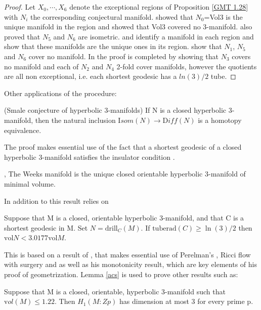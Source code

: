 \begin{proof}{}
	Let $X_0, \cdots, X_6$ denote the exceptional regions of Proposition \ref{GMT 1.28}
with $N_i$ the corresponding conjectural manifold.
\cite{GMT} showed that $N_0$=Vol3 is the unique manifold in the region
and \cite{JR} showed that Vol3 covered no 3-manifold.
	\cite{JR} also proved that $N_5$ and $N_6$ are isometric.
\cite{CLLMR} and \cite{L} identify a manifold in each region
and \cite{CLLMR} show that these manifolds are the unique ones in its region.
\cite{CLLMR} show that $N_1$, $N_5$ and $N_6$ cover no manifold.
In \cite{GT} the proof is completed by showing that $N_3$ covers no manifold
and each of $N_2$ and $N_4$ 2-fold cover manifolds,
however the quotients are all non exceptional,
i.e. each shortest geodesic has a $ln(3)/2$ tube.
\end{proof}

Other applications of the procedure:
\vskip 8pt
\begin{theorem} \cite{G1}  (Smale conjecture of hyperbolic 3-manifolds)
If N is a closed hyperbolic 3-manifold,
then the natural inclusion ${\mathrm Isom}(N)\to {\mathrm Diff}(N)$ is a homotopy equivalence.\end{theorem}
\vskip 8pt
The proof makes essential use of the fact that a shortest geodesic
of a closed hyperbolic 3-manifold satisfies the insulator condition \cite{GMT}.
\vskip 8pt
\begin{theorem} \cite{GMM}, \cite{Mi} The Weeks manifold
is the unique closed orientable hyperbolic 3-manifold of minimal volume.\end{theorem}

In addition to \cite{GMT} this result relies on 

\begin{lemma} \cite{ACS}\label{acs}  Suppose that M is a closed, orientable hyperbolic 3-manifold,
and that C is a shortest geodesic in M.
Set $N = \mathrm{drill}_C(M)$. If $\mathrm{tuberad}(C) \ge \ln(3)/2$ then
$\mathrm{vol} N < 3.0177 \mathrm{vol}M$.\end{lemma}

This is based on a result of \cite{ADST},
that makes essential use of Perelman's \cite{Pe1}, \cite{Pe2} Ricci flow with surgery and as well as his monotonicity result, which are key elements of his proof of geometrization.  Lemma \ref{acs} is used to prove other results such as:




\begin{theorem}\cite{ACS} Suppose that M is a closed, orientable, hyperbolic
3-manifold such that ${\mathrm vol}(M) \le 1.22$.
Then $H_1(M:Zp)$ has dimension at most 3 for every prime p.\end{theorem}

